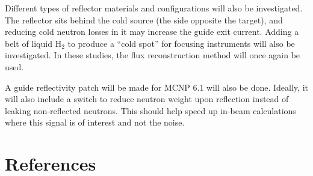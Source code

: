 \documentclass[a4paper]{jpconf}
\begin{document}
Different types of reflector materials and configurations will also be investigated.  The reflector sits behind the cold source (the side opposite the target), and reducing cold neutron losses in it may increase the guide exit current.  Adding a belt of liquid H$_2$ to produce a ``cold spot'' for focusing instruments will also be investigated.  In these studies, the flux reconstruction method will once again be used.

A guide reflectivity patch will be made for MCNP 6.1 will also be done.  Ideally, it will also include a switch to reduce neutron weight upon reflection instead of leaking non-reflected neutrons. This should help speed up in-beam calculations where this signal is of interest and not the noise.

\section*{References}

\end{document}
